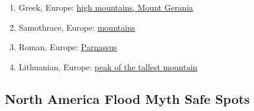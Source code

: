 \documentclass[10pt,twocolumn,letterpaper]{article}
\begin{document}
\begin{flushleft}
\begin{enumerate}
\item Greek, Europe: \href{http://www.talkorigins.org/faqs/flood-myths.html#Greek}{high mountains, Mount Gerania}
\item Samothrace, Europe: \href{http://www.talkorigins.org/faqs/flood-myths.html#Samothrace}{mountains}
\item Roman, Europe: \href{http://www.talkorigins.org/faqs/flood-myths.html#Roman}{Parnassus}
\item Lithuanian, Europe: \href{http://www.talkorigins.org/faqs/flood-myths.html#Lithuanian}{peak of the tallest mountain}
\end{enumerate}
\end{flushleft}

\subsection{North America Flood Myth Safe Spots}
\end{document}
